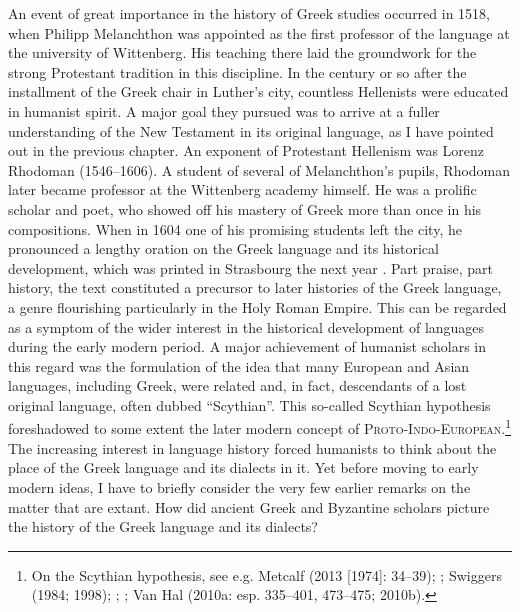 An event of great importance in the history of Greek studies occurred in 1518, when Philipp Melanchthon was appointed as the first professor of the language at the university of Wittenberg. His teaching there laid the groundwork for the strong Protestant tradition in this discipline. In the century or so after the installment of the Greek chair in Luther’s city, countless Hellenists were educated in humanist spirit. A major goal they pursued was to arrive at a fuller understanding of the New Testament in its original language, as I have pointed out in the previous chapter. An exponent of Protestant Hellenism was Lorenz Rhodoman (1546–1606). A student of several of Melanchthon’s pupils, Rhodoman later became professor at the Wittenberg academy himself. He was a prolific scholar and poet, who showed off his mastery of Greek more than once in his compositions. When in 1604 one of his promising students left the city, he pronounced a lengthy oration on the Greek language and its historical development, which was printed in Strasbourg the next year \citep{Rhodoman1605}. Part praise, part history, the text constituted a precursor to later histories of the Greek language, a genre flourishing particularly in the Holy Roman Empire. This can be regarded as a symptom of the wider interest in the historical development of languages during the early modern period. A major achievement of humanist scholars in this regard was the formulation of the idea that many European and Asian languages, including Greek, were related and, in fact, descendants of a lost original language, often dubbed “Scythian”. This so-called Scythian hypothesis foreshadowed to some extent the later modern concept of \textsc{Proto-Indo-European}.\footnote{On the Scythian hypothesis, see e.g. Metcalf (2013 [1974]: 34–39); \citet{Droixhe1980}; Swiggers (1984; 1998); \citet{Villani2003}; \citet{Considine2010}; Van Hal (2010a: esp. 335–401, 473–475; 2010b).} The increasing interest in language history forced humanists to think about the place of the Greek language and its dialects in it. Yet before moving to early modern ideas, I have to briefly consider the very few earlier remarks on the matter that are extant. How did ancient Greek and Byzantine scholars picture the history of the Greek language and its dialects?

